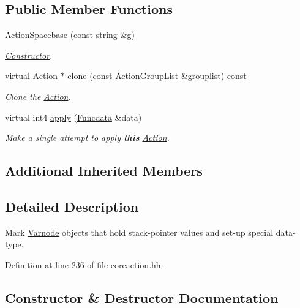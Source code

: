\subsection*{Public Member Functions}
\begin{DoxyCompactItemize}
\item 
\mbox{\hyperlink{class_action_spacebase_ae18b727e01f1f2c72c6e53f16dd8864d}{Action\+Spacebase}} (const string \&g)
\begin{DoxyCompactList}\small\item\em \mbox{\hyperlink{class_constructor}{Constructor}}. \end{DoxyCompactList}\item 
virtual \mbox{\hyperlink{class_action}{Action}} $\ast$ \mbox{\hyperlink{class_action_spacebase_a6e87ef6699ee74ba82a0d72caad1fd53}{clone}} (const \mbox{\hyperlink{class_action_group_list}{Action\+Group\+List}} \&grouplist) const
\begin{DoxyCompactList}\small\item\em Clone the \mbox{\hyperlink{class_action}{Action}}. \end{DoxyCompactList}\item 
virtual int4 \mbox{\hyperlink{class_action_spacebase_ace4b23e248568955820212813c911719}{apply}} (\mbox{\hyperlink{class_funcdata}{Funcdata}} \&data)
\begin{DoxyCompactList}\small\item\em Make a single attempt to apply {\bfseries{this}} \mbox{\hyperlink{class_action}{Action}}. \end{DoxyCompactList}\end{DoxyCompactItemize}
\subsection*{Additional Inherited Members}


\subsection{Detailed Description}
Mark \mbox{\hyperlink{class_varnode}{Varnode}} objects that hold stack-\/pointer values and set-\/up special data-\/type. 

Definition at line 236 of file coreaction.\+hh.



\subsection{Constructor \& Destructor Documentation}
\mbox{\label{class_action_spacebase_ae18b727e01f1f2c72c6e53f16dd8864d}} 
